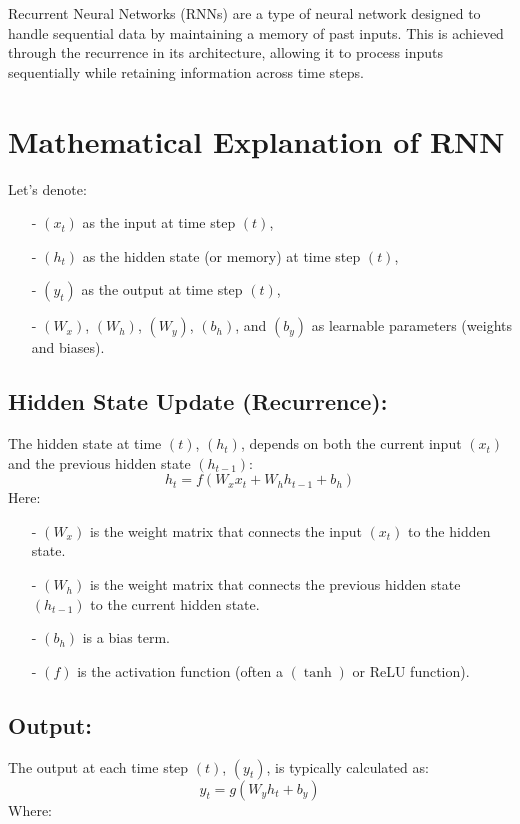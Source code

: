 \documentclass[10pt]{article}
\begin{document}
Recurrent Neural Networks (RNNs) are a type of neural network designed to handle sequential data by maintaining a memory of past inputs. This is achieved through the recurrence in its architecture, allowing it to process inputs sequentially while retaining information across time steps.

\section{ Mathematical Explanation of RNN}

Let’s denote:

\begin{itemize}
   \item [-] $( x_t )$ as the input at time step $( t )$,
   \item [-] $( h_t )$ as the hidden state (or memory) at time step $( t )$,
   \item [-] $( y_t )$ as the output at time step $( t )$,
   \item [-] $( W_x )$, $( W_h )$, $( W_y )$, $( b_h )$, and $( b_y )$ as learnable parameters (weights and biases).
\end{itemize}

\subsection{ Hidden State Update (Recurrence):}
The hidden state at time $( t )$, $( h_t )$, depends on both the current input $( x_t )$ and the previous hidden state $( h_{t-1} )$:
$$
h_t = f(W_x x_t + W_h h_{t-1} + b_h)
$$
Here:

\begin{itemize}
   \item [-] $( W_x )$ is the weight matrix that connects the input $( x_t )$ to the hidden state.
   \item [-] $( W_h )$ is the weight matrix that connects the previous hidden state $( h_{t-1} )$ to the current hidden state.
   \item [-] $( b_h )$ is a bias term.
   \item [-] $( f )$ is the activation function (often a $( \tanh )$ or ReLU function).
\end{itemize}

\subsection{ Output:}
The output at each time step $( t )$, $( y_t )$, is typically calculated as:
$$
y_t = g(W_y h_t + b_y)
$$
Where:
\end{document}
